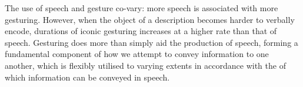 \documentclass[a4paper,man,natbib]{apa6}
\begin{document}
The use of speech and gesture co-vary: more speech is associated with more gesturing.
However, when the object of a description becomes harder to verbally encode, durations of iconic gesturing increases at a higher rate than that of speech.
Gesturing does more than simply aid the production of speech, forming a fundamental component of how we attempt to convey information to one another, which is flexibly utilised to varying extents in accordance with the of which information can be conveyed in speech.



\end{document}
